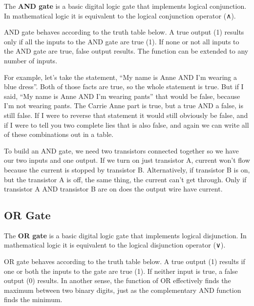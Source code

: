 The \textbf{AND gate} is a basic digital logic gate that implements logical conjunction. In mathematical logic it is
equivalent to the logical conjunction operator (∧).
\ed

AND gate behaves according to the truth table below. A true output (1) results only if all the inputs to the AND gate
are true (1). If none or not all inputs to the AND gate are true, false output results. The function can be extended
to any number of inputs.


\vspace{-15pt}

\be
For example, let's take the statement, ``My name is Anne AND I'm wearing a blue dress''. Both of those facts are true,
so the whole statement is true. But if I said, ``My name is Anne AND I'm wearing pants'' that would be false, because
I'm not wearing pants. The Carrie Anne part is true, but a true AND a false, is still false. If I were to reverse
that statement it would still obviously be false, and if I were to tell you two complete lies that is also false, and
again we can write all of these combinations out in a table.
\ee

To build an AND gate, we need two transistors connected together so we have our two inputs and one output. If we turn
on just transistor A, current won't flow because the current is stopped by transistor B. Alternatively, if transistor
B is on, but the transistor A is off, the same thing, the current can't get through. Only if transistor A AND
transistor B are on does the output wire have current.


\subsection{OR Gate}

\bd[OR Gate]
The \textbf{OR gate} is a basic digital logic gate that implements logical disjunction. In mathematical logic it is
equivalent to the logical disjunction operator (∨).
\ed

OR gate behaves according to the truth table below. A true output (1) results if one or both the inputs to the gate
are true (1). If neither input is true, a false output (0) results. In another sense, the function of OR effectively
finds the maximum between two binary digits, just as the complementary AND function finds the minimum.


